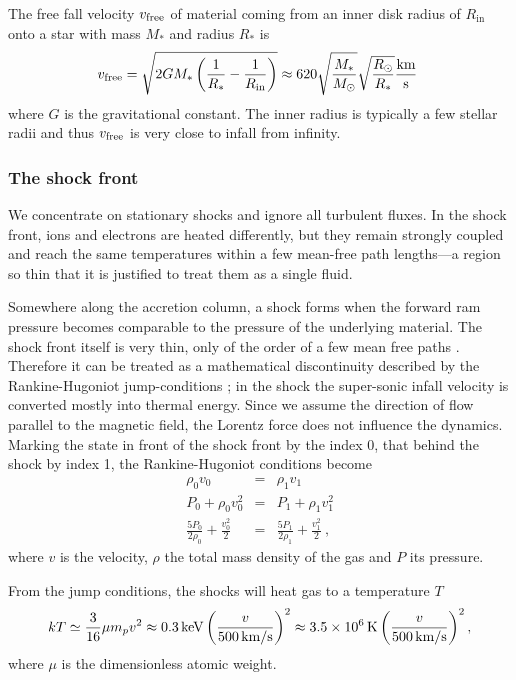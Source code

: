 \documentclass[graybox, nosecnum]{svmult}
\begin{document}
The free fall velocity $v_{\textnormal{free}}$ of material coming from an inner disk radius of $R_\mathrm{in}$ onto a star with mass $M_*$ and radius $R_*$ is
\begin{equation}
v_{\textnormal{free}} = \sqrt{{2GM_*} \left(\frac{1}{R_*} - \frac{1}{R_\mathrm{in}}\right)} \approx 620 \sqrt{\frac{M_*}{M_\odot}}\sqrt{\frac{R_\odot}{R_*}} \frac{\textnormal{km}}{\textnormal{s}}\ \label{eqn:freefall}
\end{equation}
where $G$ is the gravitational constant. The inner radius is typically a few stellar radii and thus $v_\textnormal{free}$ is very close to infall from infinity.


\subsubsection{The shock front}
We concentrate on stationary shocks and ignore all turbulent fluxes. In the shock front, ions and electrons are heated differently, but they remain strongly coupled and reach the same temperatures within a few mean-free path lengths---a region so thin that it is justified to treat them as a single fluid.

Somewhere along the accretion column, a shock forms when the forward ram pressure becomes comparable to the pressure of the underlying material. The shock front itself is very thin, only of the order of a few mean free paths \cite{raizerzeldovich}. Therefore it can be treated as a mathematical discontinuity described by the Rankine-Hugoniot jump-conditions \cite[][chap.~7, \S~15]{raizerzeldovich}; in the shock the super-sonic infall velocity is converted mostly into thermal energy. Since we assume the direction of flow parallel to the magnetic field, the Lorentz force does not influence the dynamics. Marking the state in front of the shock front by the index 0, that behind the shock by index 1, the Rankine-Hugoniot conditions become
\begin{eqnarray}
\rho_0 v_0 &=& \rho_1 v_1 \label{RH1}\\
P_0+\rho_0 v_0^2 &=& P_1+\rho_1 v_1^2 \label{RH2}\\
\frac{5 P_0}{2\rho_0}+\frac{v_0^2}{2}&=&\frac{5 P_1}{2\rho_1}+\frac{v_1^2}{2} \ ,\label{RH3}
\end{eqnarray}
where $v$ is the velocity, $\rho$ the total mass density of the gas and $P$ its pressure.

From the jump conditions, the shocks will heat gas to a temperature $T$
\begin{equation}
kT \simeq \frac{3}{16}\mu m_p v^{2} \approx 0.3\,{\rm keV}\left(\frac{v}{500\,{\rm km/s}}\right)^{2} \approx3.5\times10^6\,{\rm K} \left(\frac{v}{500\,{\rm km/s}}\right)^{2},
\label{eqn:Tshock}
\end{equation}
where $\mu$ is the dimensionless atomic weight.
\end{document}
